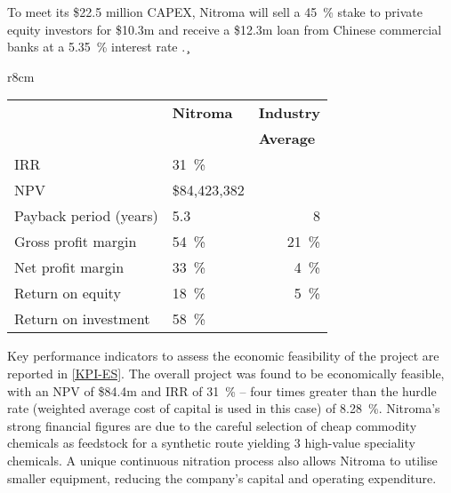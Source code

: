 To meet its \$22.5 million CAPEX, Nitroma will sell a \SI{45}{\percent} stake to private equity investors for \$10.3m and receive a \$12.3m loan from Chinese commercial banks at a \SI{5.35}{\percent} interest rate \cite{industrial_and_commercial_bank_of_china_rmb_2021}.
\c
\begin{wraptable}{r}{8cm}
\centering
\caption{Nitroma's KPIs compared to the industry average \cite{damodaran_useful_2019,outlookmoney_industry-wise_1999}}
\label{KPI-ES}
\begin{tabular}{@{}l|l|l@{}}
\toprule
           &  \multicolumn{1}{l|}{\textbf{Nitroma}} & \multicolumn{1}{c}{\textbf{Industry}} \\
                     & \multicolumn{1}{l|}{}        & \textbf{Average}                      \\ \midrule

IRR                  & \SI{31}{\percent}                         &                              \\
NPV                  & \$84,423,382                 &                              \\
Payback period (years)       & 5.3                          & \multicolumn{1}{r}{8}      \\
Gross profit margin  & \SI{54}{\percent}                         & \multicolumn{1}{r}{\SI{21}{\percent}}   \\
Net profit margin    & \SI{33}{\percent}                         & \multicolumn{1}{r}{\SI{4}{\percent}}    \\
Return on equity     & \SI{18}{\percent}                         & \multicolumn{1}{r}{\SI{5}{\percent}}   \\
Return on investment & \SI{58}{\percent}                         &                              \\ \bottomrule
\end{tabular}
\end{wraptable}

Key performance indicators to assess the economic feasibility of the project are reported in \cref{KPI-ES}. The overall project was found to be economically feasible, with an NPV of \$84.4m and IRR of \SI{31}{\percent} – four times greater than the hurdle rate (weighted average cost of capital is used in this case) of \SI{8.28}{\percent}. Nitroma’s strong financial figures are due to the careful selection of cheap commodity chemicals as feedstock for a synthetic route yielding 3 high-value speciality chemicals. A unique continuous nitration process also allows Nitroma to utilise smaller equipment, reducing the company’s capital and operating expenditure.

